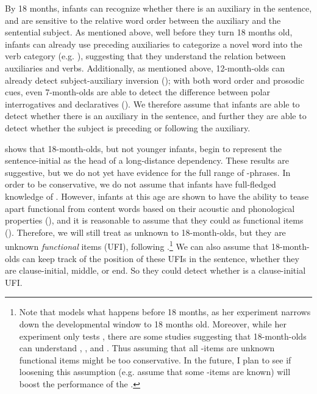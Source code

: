  By 18 months, infants can recognize whether there is an auxiliary in the sentence, and are sensitive to the relative word order between the auxiliary and the sentential subject. As mentioned above, well before they turn 18 months old, infants can already use preceding auxiliaries to categorize a novel word into the verb category (e.g. \cite{peterson2006aux, mintz2006verb}), suggesting that they understand the relation between auxiliaries and verbs. Additionally, as mentioned above, 12-month-olds can already detect subject-auxiliary inversion (\cite{geffenmintz2015wordorder}); with both word order and prosodic cues, even 7-month-olds are able to detect the difference between polar interrogatives and declaratives (\cite{geffenmintz2011}). We therefore assume that infants are able to detect whether there is an auxiliary in the sentence, and further they are able to detect whether the subject is preceding or following the auxiliary.

 \textcite{perkinslidz2021wh} shows that 18-month-olds, but not younger infants, begin to represent the sentence-initial  as the head of a long-distance dependency. These results are suggestive, but we do not yet have evidence for the full range of \twh-phrases. In order to be conservative, we do not assume that infants have full-fledged knowledge of \twh{}. However, infants at this age are shown to have the ability to tease apart functional from content words based on their acoustic and phonological properties (\cite{shi1999func,shi2014functional}), and it is reasonable to assume that they could   as functional items (\cite{perkins2019}). Therefore, we will still treat \twh{} as unknown to 18-month-olds, but they are unknown \emph{functional} items (UFI), following \textcite{perkins2019}.\footnote{Note that \textcite{perkins2019} models what happens before 18 months, as her experiment narrows down the developmental window to 18 months old. Moreover, while her experiment only tests , there are some studies suggesting that 18-month-olds can understand , , and  . Thus assuming that all \twh-items are unknown functional items might be too conservative. In the future, I plan to see if loosening this assumption (e.g. assume that some \twh-items are known) will boost the performance of the \dlearnerabbr{}.} We can also assume that 18-month-olds can keep track of the position of these UFIs in the sentence, whether they are clause-initial, middle, or end. So they could detect whether is a clause-initial UFI. 

